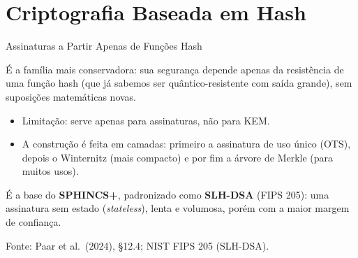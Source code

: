 \documentclass{beamer}
\begin{document}
\section{Criptografia Baseada em Hash}

\begin{frame}{Assinaturas a Partir Apenas de Funções Hash}
    \begin{tcolorbox}[colback=green!6,colframe=green!50!black,boxrule=0.5pt]
        \footnotesize
        É a família mais conservadora: sua segurança depende apenas da resistência de uma função hash (que já sabemos ser quântico-resistente com saída grande), sem suposições matemáticas novas.
    \end{tcolorbox}
    \medskip
    \begin{itemize}
        \footnotesize
        \item Limitação: serve apenas para assinaturas, não para KEM.
        \item A construção é feita em camadas: primeiro a assinatura de uso único (OTS), depois o Winternitz (mais compacto) e por fim a árvore de Merkle (para muitos usos).
    \end{itemize}
    \medskip
    \begin{tcolorbox}[colback=blue!5,colframe=blue!50!black,boxrule=0.5pt]
        \footnotesize
        É a base do \textbf{SPHINCS+}, padronizado como \textbf{SLH-DSA} (FIPS 205): uma assinatura sem estado (\textit{stateless}), lenta e volumosa, porém com a maior margem de confiança.
    \end{tcolorbox}
    \smallskip
    {\tiny Fonte: Paar et al.\ (2024), §12.4; NIST FIPS 205 (SLH-DSA).}
\end{frame}
\end{document}

